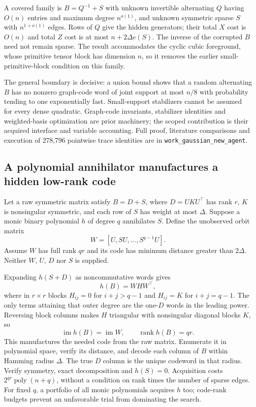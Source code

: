 \documentclass[11pt]{article}
\theoremstyle{remark}\newtheorem{remark}[theorem]{Remark}
\newcommand{\rank}{\operatorname{rank}}
\newcommand{\poly}{\operatorname{poly}}
\newcommand{\im}{\operatorname{im}}
\begin{document}
A covered family is $B=Q^{-1}+S$ with unknown invertible alternating $Q$ having $O(n)$ entries and maximum degree $n^{o(1)}$, and unknown symmetric sparse $S$ with $n^{1+o(1)}$ edges. Rows of $Q$ give the hidden generators; their total $X$ cost is $O(n)$ and total $Z$ cost is at most $n+2\Delta e(S)$. The inverse of the corrupted $B$ need not remain sparse. The result accommodates the cyclic cubic foreground, whose primitive tensor block has dimension $n$, so it removes the earlier small-primitive-block condition on this family.

The general boundary is decisive: a union bound shows that a random alternating $B$ has no nonzero graph-code word of joint support at most $n/8$ with probability tending to one exponentially fast. Small-support stabilizers cannot be assumed for every dense quadratic. Graph-code invariants, stabilizer identities and weighted-basis optimization are prior machinery; the scoped contribution is their acquired interface and variable accounting. Full proof, literature comparisons and execution of 278,796 pointwise trace identities are in \texttt{work\_gaussian\_new\_agent}.

\subsection{A polynomial annihilator manufactures a hidden low-rank code}
Let a raw symmetric matrix satisfy $B=D+S$, where $D=UKU^\top$ has rank $r$, $K$ is nonsingular symmetric, and each row of $S$ has weight at most $\Delta$. Suppose a monic binary polynomial $h$ of degree $q$ annihilates $S$. Define the unobserved orbit matrix
\[
 W=[U,SU,\ldots,S^{q-1}U].
\]
Assume $W$ has full rank $qr$ and its code has minimum distance greater than $2\Delta$. Neither $W$, $U$, $D$ nor $S$ is supplied.

Expanding $h(S+D)$ as noncommutative words gives
\[
 h(B)=WHW^\top,
\]
where in $r\times r$ blocks $H_{ij}=0$ for $i+j>q-1$ and $H_{ij}=K$ for $i+j=q-1$. The only terms attaining that outer degree are the one-$D$ words in the leading power. Reversing block columns makes $H$ triangular with nonsingular diagonal blocks $K$, so
\[
 \im h(B)=\im W,\qquad \rank h(B)=qr.
\]
This manufactures the needed code from the raw matrix. Enumerate it in polynomial space, verify its distance, and decode each column of $B$ within Hamming radius $\Delta$. The true $D$ column is the unique codeword in that radius. Verify symmetry, exact decomposition and $h(S)=0$. Acquisition costs $2^{qr}\poly(n+q)$, without a condition on rank times the number of sparse edges. For fixed $q$, a portfolio of all monic polynomials acquires $h$ too; code-rank budgets prevent an unfavorable trial from dominating the search.
\end{document}
